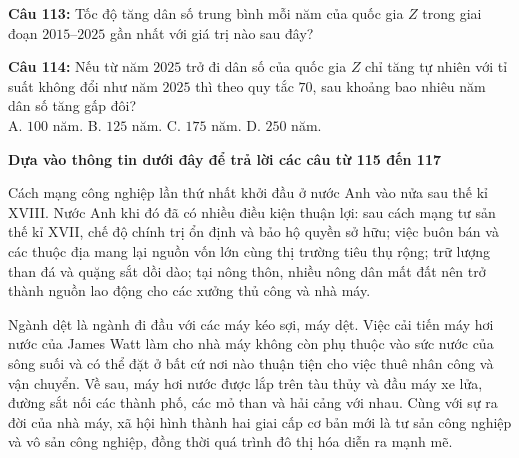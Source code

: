 \documentclass[12pt,a4paper]{article}
\begin{document}


\vspace{0.3cm}

\noindent \textbf{Câu 113:} Tốc độ tăng dân số trung bình mỗi năm của quốc gia $Z$ trong giai đoạn $2015$--$2025$ gần nhất với giá trị nào sau đây?\\
\noindent{}



\vspace{0.3cm}

\noindent \textbf{Câu 114:} Nếu từ năm $2025$ trở đi dân số của quốc gia $Z$ chỉ tăng tự nhiên với tỉ suất không đổi như năm $2025$ thì theo quy tắc $70$, sau khoảng bao nhiêu năm dân số tăng gấp đôi?\\
\noindent A. $100$ năm. \hfill B. $125$ năm. \hfill C. $175$ năm. \hfill D. $250$ năm.



\vspace{0.5cm}
\noindent\textbf{Dựa vào thông tin dưới đây để trả lời các câu từ 115 đến 117}%


\par\nobreak

Cách mạng công nghiệp lần thứ nhất khởi đầu ở nước Anh vào nửa sau thế kỉ XVIII. Nước Anh khi đó đã có nhiều điều kiện thuận lợi: sau cách mạng tư sản thế kỉ XVII, chế độ chính trị ổn định và bảo hộ quyền sở hữu; việc buôn bán và các thuộc địa mang lại nguồn vốn lớn cùng thị trường tiêu thụ rộng; trữ lượng than đá và quặng sắt dồi dào; tại nông thôn, nhiều nông dân mất đất nên trở thành nguồn lao động cho các xưởng thủ công và nhà máy.

Ngành dệt là ngành đi đầu với các máy kéo sợi, máy dệt. Việc cải tiến máy hơi nước của James Watt làm cho nhà máy không còn phụ thuộc vào sức nước của sông suối và có thể đặt ở bất cứ nơi nào thuận tiện cho việc thuê nhân công và vận chuyển. Về sau, máy hơi nước được lắp trên tàu thủy và đầu máy xe lửa, đường sắt nối các thành phố, các mỏ than và hải cảng với nhau. Cùng với sự ra đời của nhà máy, xã hội hình thành hai giai cấp cơ bản mới là tư sản công nghiệp và vô sản công nghiệp, đồng thời quá trình đô thị hóa diễn ra mạnh mẽ.

\par\nobreak
\end{document}
